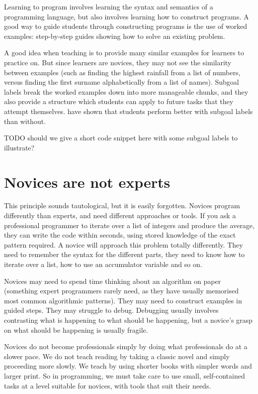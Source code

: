 \documentclass{article}
\begin{document}
Learning to program involves learning the syntax and semantics of a programming language, but also involves learning how to construct programs.  A good way to guide students through constructing programs is the use of worked examples: step-by-step guides showing how to solve an existing problem.

A good idea when teaching is to provide many similar examples for learners to practice on.  But since learners are novices, they may not see the similarity between examples (such as finding the highest rainfall from a list of numbers, versus finding the first surname alphabetically from a list of names).  Subgoal labels break the worked examples down into more manageable chunks, and they also provide a structure which students can apply to future tasks that they attempt themselves.  \citet{morrison-subgoals,morrison-parsons} have shown that students perform better with subgoal labels than without.

TODO should we give a short code snippet here with some subgoal labels to illustrate?

\section{Novices are not experts}

This principle sounds tautological, but it is easily forgotten.  Novices program differently than experts, and need different approaches or tools.  If you ask a professional programmer to iterate over a list of integers and produce the average, they can write the code within seconds, using stored knowledge of the exact pattern required.  A novice will approach this problem totally differently.  They need to remember the syntax for the different parts, they need to know how to iterate over a list, how to use an accumulator variable and so on.

Novices may need to spend time thinking about an algorithm on paper (something expert programmers rarely need, as they have usually memorised most common algorithmic patterns).  They may need to construct examples in guided steps.  They may struggle to debug.  Debugging usually involves contrasting what is happening to what should be happening, but a novice's grasp on what should be happening is usually fragile.

Novices do not become professionals simply by doing what professionals do at a slower pace.  We do not teach reading by taking a classic novel and simply proceeding more slowly.  We teach by using shorter books with simpler words and larger print.  So in programming, we must take care to use small, self-contained tasks at a level suitable for novices, with tools that suit their needs.
\end{document}
